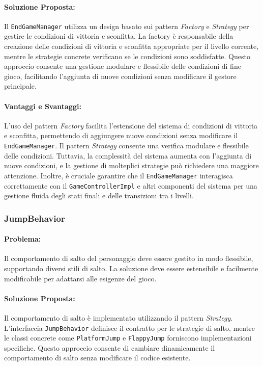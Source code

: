 \documentclass[a4paper,12pt]{report}
\begin{document}
\paragraph{Soluzione Proposta:} Il \texttt{EndGameManager} utilizza un design basato sui pattern \textit{Factory} e \textit{Strategy} per gestire le condizioni di vittoria e sconfitta. La factory è responsabile della creazione delle condizioni di vittoria e sconfitta appropriate per il livello corrente, mentre le strategie concrete verificano se le condizioni sono soddisfatte. Questo approccio consente una gestione modulare e flessibile delle condizioni di fine gioco, facilitando l'aggiunta di nuove condizioni senza modificare il gestore principale.

\paragraph{Vantaggi e Svantaggi:} 
L'uso del pattern \textit{Factory} facilita l'estensione del sistema di condizioni di vittoria e sconfitta, permettendo di aggiungere nuove condizioni senza modificare il \texttt{EndGameManager}. Il pattern \textit{Strategy} consente una verifica modulare e flessibile delle condizioni. Tuttavia, la complessità del sistema aumenta con l'aggiunta di nuove condizioni, e la gestione di molteplici strategie può richiedere una maggiore attenzione. Inoltre, è cruciale garantire che il \texttt{EndGameManager} interagisca correttamente con il \texttt{GameControllerImpl} e altri componenti del sistema per una gestione fluida degli stati finali e delle transizioni tra i livelli.

\subsubsection{JumpBehavior}

\paragraph{Problema:} Il comportamento di salto del personaggio deve essere gestito in modo flessibile, supportando diversi stili di salto. La soluzione deve essere estensibile e facilmente modificabile per adattarsi alle esigenze del gioco.

\paragraph{Soluzione Proposta:} Il comportamento di salto è implementato utilizzando il pattern \textit{Strategy}. L'interfaccia \texttt{JumpBehavior} definisce il contratto per le strategie di salto, mentre le classi concrete come \texttt{PlatformJump} e \texttt{FlappyJump} forniscono implementazioni specifiche. Questo approccio consente di cambiare dinamicamente il comportamento di salto senza modificare il codice esistente.
\end{document}
